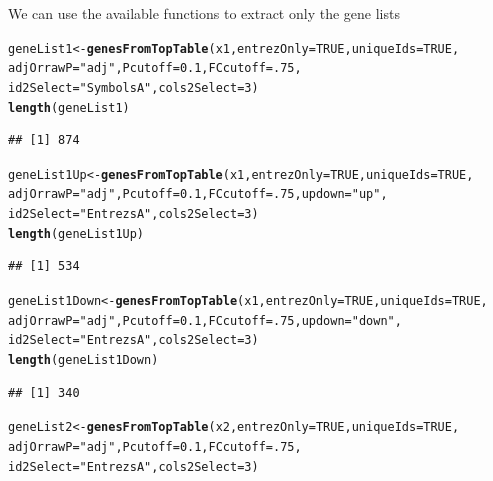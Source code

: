 \documentclass{article}\usepackage[]{graphicx}\usepackage[]{color}
\makeatletter
\newcommand{\hlnum}[1]{\textcolor[rgb]{0.686,0.059,0.569}{#1}}%
\newcommand{\hlstr}[1]{\textcolor[rgb]{0.192,0.494,0.8}{#1}}%
\newcommand{\hlstd}[1]{\textcolor[rgb]{0.345,0.345,0.345}{#1}}%
\newcommand{\hlkwb}[1]{\textcolor[rgb]{0.69,0.353,0.396}{#1}}%
\newcommand{\hlkwc}[1]{\textcolor[rgb]{0.333,0.667,0.333}{#1}}%
\newcommand{\hlkwd}[1]{\textcolor[rgb]{0.737,0.353,0.396}{\textbf{#1}}}%
\newenvironment{kframe}{%
 \def\at@end@of@kframe{}%
 \ifinner\ifhmode%
  \def\at@end@of@kframe{\end{minipage}}%
  \begin{minipage}{\columnwidth}%
 \fi\fi%
 \def\FrameCommand##1{\hskip\@totalleftmargin \hskip-\fboxsep
 \colorbox{shadecolor}{##1}\hskip-\fboxsep
     \hskip-\linewidth \hskip-\@totalleftmargin \hskip\columnwidth}%
 \MakeFramed {\advance\hsize-\width
   \@totalleftmargin\z@ \linewidth\hsize
   \@setminipage}}%
 {\par\unskip\endMakeFramed%
 \at@end@of@kframe}
\newenvironment{knitrout}{}{} %
\makeatother
\begin{document}
We can use the available functions to extract only the gene lists
\begin{knitrout}
\color{fgcolor}\begin{kframe}
\begin{alltt}
\hlstd{geneList1}  \hlkwb{<-} \hlkwd{genesFromTopTable} \hlstd{(x1,} \hlkwc{entrezOnly} \hlstd{=} \hlnum{TRUE}\hlstd{,} \hlkwc{uniqueIds}\hlstd{=}\hlnum{TRUE}\hlstd{,}
                                 \hlkwc{adjOrrawP} \hlstd{=} \hlstr{"adj"}\hlstd{,} \hlkwc{Pcutoff} \hlstd{=} \hlnum{0.1}\hlstd{,} \hlkwc{FCcutoff} \hlstd{=} \hlnum{.75}\hlstd{,}
                                 \hlkwc{id2Select} \hlstd{=} \hlstr{"SymbolsA"} \hlstd{,} \hlkwc{cols2Select} \hlstd{=}\hlnum{3}\hlstd{)}
\hlkwd{length}\hlstd{(geneList1)}
\end{alltt}
\begin{verbatim}
## [1] 874
\end{verbatim}
\begin{alltt}
\hlstd{geneList1Up}  \hlkwb{<-} \hlkwd{genesFromTopTable} \hlstd{(x1,} \hlkwc{entrezOnly} \hlstd{=} \hlnum{TRUE}\hlstd{,} \hlkwc{uniqueIds}\hlstd{=}\hlnum{TRUE}\hlstd{,}
                                 \hlkwc{adjOrrawP} \hlstd{=} \hlstr{"adj"}\hlstd{,} \hlkwc{Pcutoff} \hlstd{=} \hlnum{0.1}\hlstd{,} \hlkwc{FCcutoff} \hlstd{=} \hlnum{.75}\hlstd{,} \hlkwc{updown}\hlstd{=}\hlstr{"up"}\hlstd{,}
                                 \hlkwc{id2Select} \hlstd{=} \hlstr{"EntrezsA"} \hlstd{,} \hlkwc{cols2Select} \hlstd{=}\hlnum{3}\hlstd{)}
\hlkwd{length}\hlstd{(geneList1Up)}
\end{alltt}
\begin{verbatim}
## [1] 534
\end{verbatim}
\begin{alltt}
\hlstd{geneList1Down}  \hlkwb{<-} \hlkwd{genesFromTopTable} \hlstd{(x1,} \hlkwc{entrezOnly} \hlstd{=} \hlnum{TRUE}\hlstd{,} \hlkwc{uniqueIds}\hlstd{=}\hlnum{TRUE}\hlstd{,}
                                 \hlkwc{adjOrrawP} \hlstd{=} \hlstr{"adj"}\hlstd{,} \hlkwc{Pcutoff} \hlstd{=} \hlnum{0.1}\hlstd{,} \hlkwc{FCcutoff} \hlstd{=} \hlnum{.75}\hlstd{,} \hlkwc{updown}\hlstd{=}\hlstr{"down"}\hlstd{,}
                                 \hlkwc{id2Select} \hlstd{=} \hlstr{"EntrezsA"} \hlstd{,} \hlkwc{cols2Select} \hlstd{=}\hlnum{3}\hlstd{)}
\hlkwd{length}\hlstd{(geneList1Down)}
\end{alltt}
\begin{verbatim}
## [1] 340
\end{verbatim}
\begin{alltt}
\hlstd{geneList2} \hlkwb{<-} \hlkwd{genesFromTopTable} \hlstd{(x2,} \hlkwc{entrezOnly} \hlstd{=} \hlnum{TRUE}\hlstd{,} \hlkwc{uniqueIds}\hlstd{=}\hlnum{TRUE}\hlstd{,}
                                 \hlkwc{adjOrrawP} \hlstd{=} \hlstr{"adj"}\hlstd{,} \hlkwc{Pcutoff} \hlstd{=} \hlnum{0.1}\hlstd{,} \hlkwc{FCcutoff} \hlstd{=} \hlnum{.75}\hlstd{,}
                                 \hlkwc{id2Select} \hlstd{=} \hlstr{"EntrezsA"} \hlstd{,} \hlkwc{cols2Select} \hlstd{=}\hlnum{3}\hlstd{)}


\end{alltt}
\end{kframe}
\end{knitrout}
\end{document}

